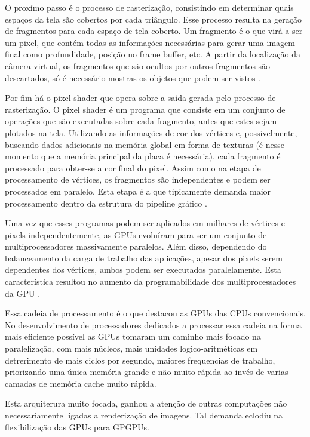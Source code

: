   O proxímo passo é o processo de rasterização, consistindo em determinar quais espaços da tela são cobertos por cada triângulo. Esse processo resulta na geração de fragmentos para cada espaço de tela coberto. Um fragmento é o que virá a ser um pixel, que contém todas as informações necessárias para gerar uma imagem final como profundidade, posição no frame buffer, etc. A partir da localização da câmera virtual, os fragmentos que são ocultos por outros fragmentos são descartados, só é necessário mostras os objetos que podem ser vistos \citep{gpu-comp:08}.

  Por fim há o pixel shader que opera sobre a saída gerada pelo processo de rasterização. O pixel shader é um programa que consiste em um conjunto de operações que são executadas sobre cada fragmento, antes que estes sejam plotados na tela. Utilizando as informações de cor dos vértices e, possivelmente, buscando dados adicionais na memória global em forma de texturas (é nesse momento que a memória principal da placa é necessária), cada fragmento é processado para obter-se a cor final do pixel. Assim como na etapa de processamento de vértices, os fragmentos são independentes e podem ser processados em paralelo. Esta etapa é a que tipicamente demanda maior processamento dentro da estrutura do pipeline gráfico \citep{gpu-comp:08}.

  Uma vez que esses programas podem ser aplicados em milhares de vértices e pixels independentemente, as GPUs evoluíram para ser um conjunto de multiprocessadores massivamente paralelos. Além disso, dependendo do balanceamento da carga de trabalho das aplicações, apesar dos pixels serem dependentes dos vértices, ambos podem ser executados paralelamente. Esta característica resultou no aumento da programabilidade dos multiprocessadores da GPU \citep{massively:16}.

  Essa cadeia de processamento é o que destacou as GPUs das CPUs convencionais. No desenvolvimento de processadores dedicados a processar essa cadeia na forma mais eficiente possível as GPUs tomaram um caminho mais focado na paralelização, com mais núcleos, mais unidades logico-aritméticas em detrerimento de mais ciclos por segundo, maiores frequencias de trabalho, priorizando uma única memória grande e não muito rápida ao invés de varias camadas de memória cache muito rápida.

  Esta arquiterura muito focada, ganhou a atenção de outras computações não necessariamente ligadas a renderização de imagens. Tal demanda eclodiu na flexibilização das GPUs para GPGPUs.

